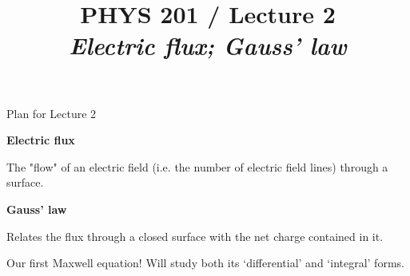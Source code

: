 \renewcommand{\prevlecture}{1 }
\renewcommand{\thislecture}{2 }
\renewcommand{\nextlecture}{3 }

%
%

\title[PHYS 201 / Lecture \thislecture]
{
  PHYS 201 / Lecture \thislecture \\
    {\it Electric flux; Gauss' law}\\
}



\begin{frame}[plain]
  \titlepage
\end{frame}


%
%

\renewcommand{\lecturesummarytitle}{Revision }


%
%

\begin{frame}{Plan for Lecture \thislecture}

\begin{itemize}
{\small
\item {\bf Electric flux}
  \begin{itemize}
  {\scriptsize
     \item The "flow" of an electric field (i.e. the number of electric field lines) through a surface.
  }
  \end{itemize}

\item {\bf Gauss' law}
  \begin{itemize}
  {\scriptsize
     \item Relates the flux through a closed surface with the net charge contained in it.
     \item Our first Maxwell equation! Will study both its `differential' and `integral' forms.
  }
  \end{itemize}
}
\end{itemize}

\end{frame}


%
%
%

